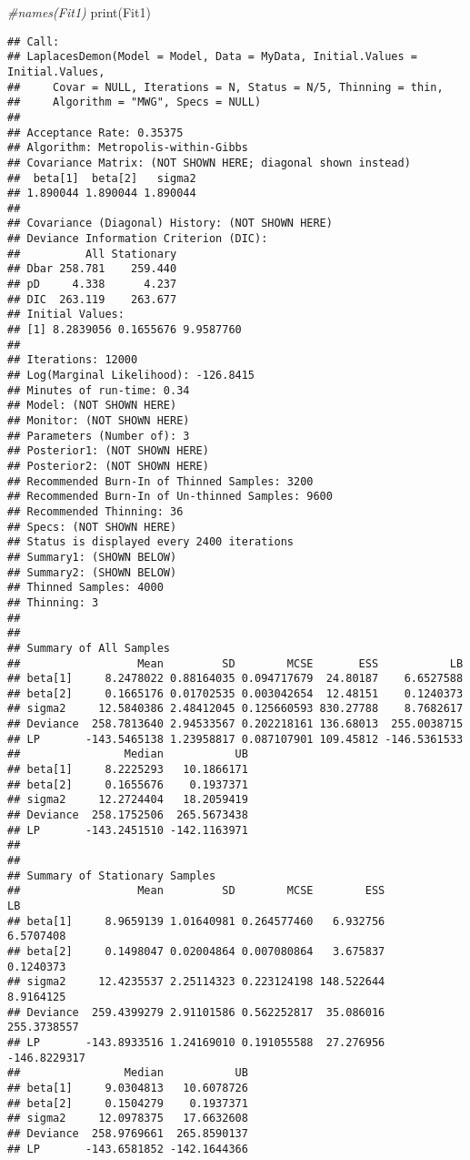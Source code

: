 \documentclass[
]{book}
\newenvironment{Shaded}{\begin{snugshade}}{\end{snugshade}}
\newcommand{\CommentTok}[1]{\textcolor[rgb]{0.56,0.35,0.01}{\textit{#1}}}
\newcommand{\FunctionTok}[1]{\textcolor[rgb]{0.00,0.00,0.00}{#1}}
\newcommand{\NormalTok}[1]{#1}
\begin{document}
\begin{Shaded}
\begin{Highlighting}[]
\CommentTok{\#names(Fit1)}
\FunctionTok{print}\NormalTok{(Fit1)}
\end{Highlighting}
\end{Shaded}

\begin{verbatim}
## Call:
## LaplacesDemon(Model = Model, Data = MyData, Initial.Values = Initial.Values, 
##     Covar = NULL, Iterations = N, Status = N/5, Thinning = thin, 
##     Algorithm = "MWG", Specs = NULL)
## 
## Acceptance Rate: 0.35375
## Algorithm: Metropolis-within-Gibbs
## Covariance Matrix: (NOT SHOWN HERE; diagonal shown instead)
##  beta[1]  beta[2]   sigma2 
## 1.890044 1.890044 1.890044 
## 
## Covariance (Diagonal) History: (NOT SHOWN HERE)
## Deviance Information Criterion (DIC):
##          All Stationary
## Dbar 258.781    259.440
## pD     4.338      4.237
## DIC  263.119    263.677
## Initial Values:
## [1] 8.2839056 0.1655676 9.9587760
## 
## Iterations: 12000
## Log(Marginal Likelihood): -126.8415
## Minutes of run-time: 0.34
## Model: (NOT SHOWN HERE)
## Monitor: (NOT SHOWN HERE)
## Parameters (Number of): 3
## Posterior1: (NOT SHOWN HERE)
## Posterior2: (NOT SHOWN HERE)
## Recommended Burn-In of Thinned Samples: 3200
## Recommended Burn-In of Un-thinned Samples: 9600
## Recommended Thinning: 36
## Specs: (NOT SHOWN HERE)
## Status is displayed every 2400 iterations
## Summary1: (SHOWN BELOW)
## Summary2: (SHOWN BELOW)
## Thinned Samples: 4000
## Thinning: 3
## 
## 
## Summary of All Samples
##                  Mean         SD        MCSE       ESS           LB
## beta[1]     8.2478022 0.88164035 0.094717679  24.80187    6.6527588
## beta[2]     0.1665176 0.01702535 0.003042654  12.48151    0.1240373
## sigma2     12.5840386 2.48412045 0.125660593 830.27788    8.7682617
## Deviance  258.7813640 2.94533567 0.202218161 136.68013  255.0038715
## LP       -143.5465138 1.23958817 0.087107901 109.45812 -146.5361533
##                Median           UB
## beta[1]     8.2225293   10.1866171
## beta[2]     0.1655676    0.1937371
## sigma2     12.2724404   18.2059419
## Deviance  258.1752506  265.5673438
## LP       -143.2451510 -142.1163971
## 
## 
## Summary of Stationary Samples
##                  Mean         SD        MCSE        ESS           LB
## beta[1]     8.9659139 1.01640981 0.264577460   6.932756    6.5707408
## beta[2]     0.1498047 0.02004864 0.007080864   3.675837    0.1240373
## sigma2     12.4235537 2.25114323 0.223124198 148.522644    8.9164125
## Deviance  259.4399279 2.91101586 0.562252817  35.086016  255.3738557
## LP       -143.8933516 1.24169010 0.191055588  27.276956 -146.8229317
##                Median           UB
## beta[1]     9.0304813   10.6078726
## beta[2]     0.1504279    0.1937371
## sigma2     12.0978375   17.6632608
## Deviance  258.9769661  265.8590137
## LP       -143.6581852 -142.1644366
\end{verbatim}
\end{document}
